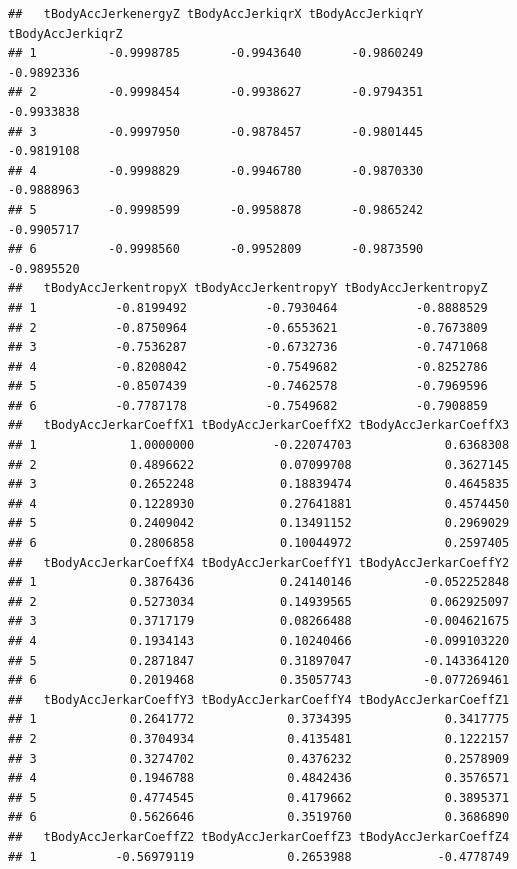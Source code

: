 \documentclass[
]{article}
\begin{document}
\begin{verbatim}
##   tBodyAccJerkenergyZ tBodyAccJerkiqrX tBodyAccJerkiqrY tBodyAccJerkiqrZ
## 1          -0.9998785       -0.9943640       -0.9860249       -0.9892336
## 2          -0.9998454       -0.9938627       -0.9794351       -0.9933838
## 3          -0.9997950       -0.9878457       -0.9801445       -0.9819108
## 4          -0.9998829       -0.9946780       -0.9870330       -0.9888963
## 5          -0.9998599       -0.9958878       -0.9865242       -0.9905717
## 6          -0.9998560       -0.9952809       -0.9873590       -0.9895520
##   tBodyAccJerkentropyX tBodyAccJerkentropyY tBodyAccJerkentropyZ
## 1           -0.8199492           -0.7930464           -0.8888529
## 2           -0.8750964           -0.6553621           -0.7673809
## 3           -0.7536287           -0.6732736           -0.7471068
## 4           -0.8208042           -0.7549682           -0.8252786
## 5           -0.8507439           -0.7462578           -0.7969596
## 6           -0.7787178           -0.7549682           -0.7908859
##   tBodyAccJerkarCoeffX1 tBodyAccJerkarCoeffX2 tBodyAccJerkarCoeffX3
## 1             1.0000000           -0.22074703             0.6368308
## 2             0.4896622            0.07099708             0.3627145
## 3             0.2652248            0.18839474             0.4645835
## 4             0.1228930            0.27641881             0.4574450
## 5             0.2409042            0.13491152             0.2969029
## 6             0.2806858            0.10044972             0.2597405
##   tBodyAccJerkarCoeffX4 tBodyAccJerkarCoeffY1 tBodyAccJerkarCoeffY2
## 1             0.3876436            0.24140146          -0.052252848
## 2             0.5273034            0.14939565           0.062925097
## 3             0.3717179            0.08266488          -0.004621675
## 4             0.1934143            0.10240466          -0.099103220
## 5             0.2871847            0.31897047          -0.143364120
## 6             0.2019468            0.35057743          -0.077269461
##   tBodyAccJerkarCoeffY3 tBodyAccJerkarCoeffY4 tBodyAccJerkarCoeffZ1
## 1             0.2641772             0.3734395             0.3417775
## 2             0.3704934             0.4135481             0.1222157
## 3             0.3274702             0.4376232             0.2578909
## 4             0.1946788             0.4842436             0.3576571
## 5             0.4774545             0.4179662             0.3895371
## 6             0.5626646             0.3519760             0.3686890
##   tBodyAccJerkarCoeffZ2 tBodyAccJerkarCoeffZ3 tBodyAccJerkarCoeffZ4
## 1           -0.56979119             0.2653988            -0.4778749

\end{verbatim}
\end{document}
